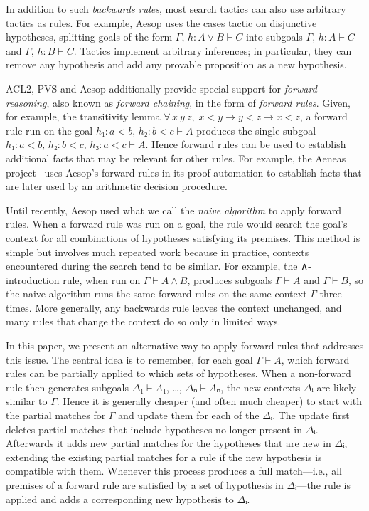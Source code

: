 \documentclass[runningheads,leqno]{llncs}
\newcommand{\All}[2]{\ensuremath{\forall\, #1,\; #2}}
\begin{document}
In addition to such \emph{backwards rules}, most search tactics can also use arbitrary tactics as rules.
For example, Aesop uses the cases tactic on disjunctive hypotheses, splitting goals of the form $Γ,\, h : A ∨ B ⊢ C$ into subgoals $Γ,\, h : A ⊢ C$ and $Γ,\, h : B ⊢ C$.
Tactics implement arbitrary inferences; in particular, they can remove any hypothesis and add any provable proposition as a new hypothesis.

ACL2, PVS and Aesop additionally provide special support for \emph{forward reasoning}, also known as \emph{forward chaining}, in the form of \emph{forward rules}.
Given, for example, the transitivity lemma $\All{x~y~z}{x < y → y < z → x < z}$, a forward rule run on the goal $h₁ : a < b,\, h₂ : b < c ⊢ A$ produces the single subgoal $h₁ : a < b,\, h₂ : b < c,\, h₃ : a < c ⊢ A$.
Hence forward rules can be used to establish additional facts that may be relevant for other rules.
For example, the Aeneas project~\cite{Aeneas} uses Aesop's forward rules in its proof automation to establish facts that are later used by an arithmetic decision procedure.

Until recently, Aesop used what we call the \emph{naive algorithm} to apply forward rules.
When a forward rule was run on a goal, the rule would search the goal's context for all combinations of hypotheses satisfying its premises.
This method is simple but involves much repeated work because in practice, contexts encountered during the search tend to be similar.
For example, the ∧-introduction rule, when run on $Γ ⊢ A ∧ B$, produces subgoals $Γ ⊢ A$ and $Γ ⊢ B$, so the naive algorithm runs the same forward rules on the same context $Γ$ three times.
More generally, any backwards rule leaves the context unchanged, and many rules that change the context do so only in limited ways.

In this paper, we present an alternative way to apply forward rules that addresses this issue.
The central idea is to remember, for each goal $Γ ⊢ A$, which forward rules can be partially applied to which sets of hypotheses.
When a non-forward rule then generates subgoals $Δ₁ ⊢ A₁$, \dots, $Δₙ ⊢ Aₙ$, the new contexts $Δᵢ$ are likely similar to $Γ$.
Hence it is generally cheaper (and often much cheaper) to start with the partial matches for $Γ$ and update them for each of the $Δᵢ$.
The update first deletes partial matches that include hypotheses no longer present in $Δᵢ$.
Afterwards it adds new partial matches for the hypotheses that are new in $Δᵢ$, extending the existing partial matches for a rule if the new hypothesis is compatible with them.
Whenever this process produces a full match---i.e., all premises of a forward rule are satisfied by a set of hypothesis in $Δᵢ$---the rule is applied and adds a corresponding new hypothesis to $Δᵢ$.
\end{document}
